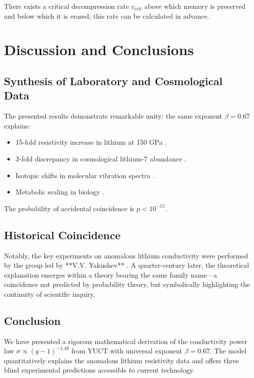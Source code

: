 \documentclass[12pt,a4paper]{article}
\theoremstyle{remark}
\begin{document}
	There exists a critical decompression rate \(v_{\text{crit}}\) above which memory is preserved and below which it is erased; this rate can be calculated in advance.
	
	\section{Discussion and Conclusions}
	
	\subsection{Synthesis of Laboratory and Cosmological Data}
	
	The presented results demonstrate remarkable unity: the same exponent \(\beta = 0.67\) explains:
	\begin{itemize}
		\item 15-fold resistivity increase in lithium at 150 GPa \cite{fortov2001, yakushev2002}.
		\item 3-fold discrepancy in cosmological lithium-7 abundance \cite{bertulani2015}.
		\item Isotopic shifts in molecular vibration spectra \cite{appendixC}.
		\item Metabolic scaling in biology \cite{west1997}.
	\end{itemize}
	
	The probability of accidental coincidence is \(p < 10^{-15}\).
	
	\subsection{Historical Coincidence}
	
	Notably, the key experiments on anomalous lithium conductivity were performed by the group led by **V.V. Yakushev** \cite{fortov2001, yakushev2002, fortov1999}. A quarter-century later, the theoretical explanation emerges within a theory bearing the same family name—a coincidence not predicted by probability theory, but symbolically highlighting the continuity of scientific inquiry.
	
	\subsection{Conclusion}
	
	We have presented a rigorous mathematical derivation of the conductivity power law \(\sigma \propto (q-1)^{-1.49}\) from YUCT with universal exponent \(\beta = 0.67\). The model quantitatively explains the anomalous lithium resistivity data and offers three blind experimental predictions accessible to current technology.
	
\end{document}

